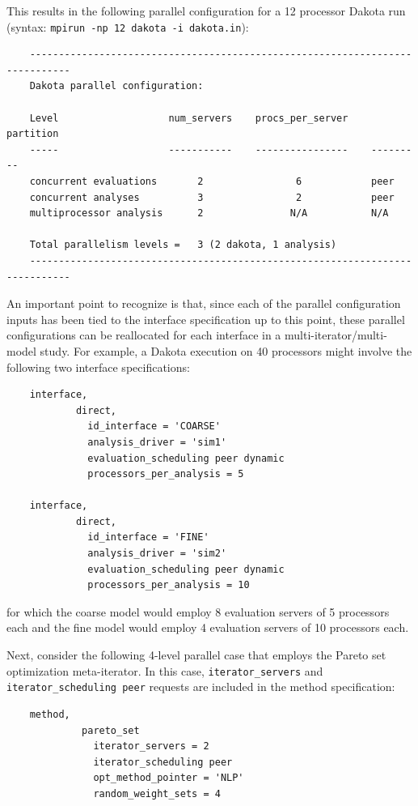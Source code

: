 This results in the following parallel configuration for a 12
processor Dakota run \\
(syntax: \texttt{mpirun -np 12 dakota -i dakota.in}):
\begin{small}
\begin{verbatim}
    -----------------------------------------------------------------------------
    Dakota parallel configuration:

    Level                   num_servers    procs_per_server    partition
    -----                   -----------    ----------------    ---------
    concurrent evaluations       2                6            peer
    concurrent analyses          3                2            peer
    multiprocessor analysis      2               N/A           N/A

    Total parallelism levels =   3 (2 dakota, 1 analysis)
    -----------------------------------------------------------------------------
\end{verbatim}
\end{small}

An important point to recognize is that, since each of the parallel
configuration inputs has been tied to the interface specification up
to this point, these parallel configurations can be reallocated for
each interface in a multi-iterator/multi-model study. For example,
a Dakota execution on 40 processors might involve the following two
interface specifications:
\begin{small}
\begin{verbatim}
    interface,
            direct,
              id_interface = 'COARSE'
              analysis_driver = 'sim1'
              evaluation_scheduling peer dynamic
              processors_per_analysis = 5

    interface,
            direct,
              id_interface = 'FINE'
              analysis_driver = 'sim2'
              evaluation_scheduling peer dynamic
              processors_per_analysis = 10
\end{verbatim}
\end{small}

for which the coarse model would employ 8 evaluation servers of 5 
processors each and the fine model would employ 4 evaluation servers 
of 10 processors each.

Next, consider the following 4-level parallel case that employs the
Pareto set optimization meta-iterator. In this case,
\texttt{iterator\_servers} and \texttt{iterator\_scheduling peer}
requests are included in the method specification:
\begin{small}
\begin{verbatim}
    method,
             pareto_set
               iterator_servers = 2
               iterator_scheduling peer
               opt_method_pointer = 'NLP'
               random_weight_sets = 4
\end{verbatim}
\end{small}

